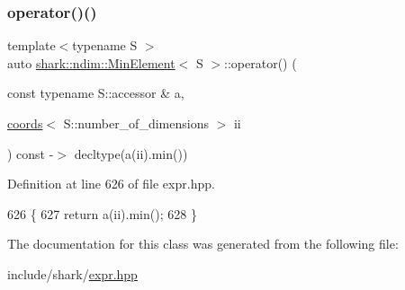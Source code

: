 \subsubsection{\texorpdfstring{operator()()}{operator()()}}
{\footnotesize\ttfamily template$<$typename S $>$ \\
auto \hyperlink{classshark_1_1ndim_1_1_min_element}{shark\+::ndim\+::\+Min\+Element}$<$ S $>$\+::operator() (\begin{DoxyParamCaption}\item[{const typename S\+::accessor \&}]{a,  }\item[{\hyperlink{structshark_1_1ndim_1_1coords}{coords}$<$ S\+::number\+\_\+of\+\_\+dimensions $>$}]{ii }\end{DoxyParamCaption}) const -\/$>$ decltype(a(ii).min()) \hspace{0.3cm}{\ttfamily [inline]}}



Definition at line 626 of file expr.\+hpp.


\begin{DoxyCode}
626                                                                                                            
                     \{
627                 \textcolor{keywordflow}{return} a(ii).min();
628             \}
\end{DoxyCode}


The documentation for this class was generated from the following file\+:\begin{DoxyCompactItemize}
\item 
include/shark/\hyperlink{expr_8hpp}{expr.\+hpp}\end{DoxyCompactItemize}
